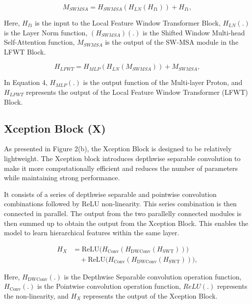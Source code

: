 \documentclass[twocolumn]{svjour3}          %
\begin{document}
\begin{equation}
{M_{SWMSA}}= {H_{SWMSA}}({H_{LN}}({H_{I1}})) + {H_{I1}},
\end{equation}

Here,  ${H_{I1}}$ is the input to the Local Feature Window Transformer Block, ${H_{LN}}$$(.)$ is the Layer Norm function, $({H_{SWMSA}})$$(.)$ is the Shifted Window Multi-head Self-Attention function, ${M_{SWMSA}}$  is the output of the SW-MSA module in the LFWT Block.

\begin{equation}
{H_{LFWT}}= {H_{MLP}}({H_{LN}}({M_{SWMSA}})) + {M_{SWMSA}},
\end{equation}

In Equation 4, ${H_{MLP}}$$(.)$ is the output function of the Multi-layer Proton, and ${H_{LFWT}}$ represents the output of the Local Feature Window Transformer (LFWT) Block.

\subsection{Xception Block (X)}

As presented in Figure 2(b), the Xception Block is designed to be relatively lightweight. The Xception block introduces depthwise separable convolution to make it more computationally efficient and reduces the number of parameters while maintaining strong performance.

It consists of a series of depthwise separable and pointwise convolution combinations followed by ReLU non-linearity. This series combination is then connected in parallel. The output from the two parallelly connected modules is then summed up to obtain the output from the Xception Block. This enables the model to learn hierarchical features within the same layer.

\begin{equation}
\begin{aligned}
    {H_{X}} &= \text{ReLU}\bigl(H_{\text{Conv}}(H_{\text{DWConv}}(H_{\text{SWT}}))\bigr) \\
    &\quad+ \text{ReLU}\bigl(H_{\text{Conv}}(H_{\text{DWConv}}(H_{\text{SWT}}))\bigr),
\end{aligned}
\end{equation}

Here, $H_{\text{DWConv}}$$(.)$ is the Depthwise Separable convolution operation function, ${H_{\text{Conv}}}$$(.)$  is the Pointwise convolution operation function, ${ReLU}$$(.)$ represents the non-linearity, and ${H_{X}}$ represents the output of the Xception Block.
\end{document}
